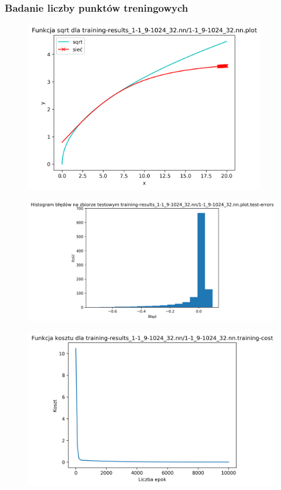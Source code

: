 \documentclass{classrep}
\begin{document}
{{            \subsubsection{Badanie liczby punktów treningowych}
            {
                \begin{figure}[!htbp]
                    \centering
                    \includegraphics[width=105mm]{wykresy/1-1_9-1024_32_nn_plot.png}
                \end{figure}
                \begin{figure}[!htbp]
                    \centering
                    \includegraphics[width=140mm]{wykresy/1-1_9-1024_32_nn_plot_test-errors.png}
                \end{figure}
                \begin{figure}[!htbp]
                    \centering
                    \includegraphics[width=120mm]{wykresy/1-1_9-1024_32_nn_training-cost.png}

\end{figure}}}}
\end{document}
